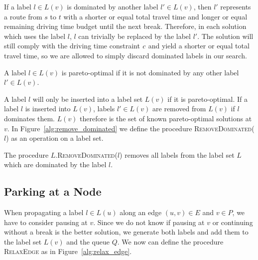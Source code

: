If a label $l \in L(v)$ is dominated by another label $l' \in L(v)$, then $l'$ represents a route from $s$ to $t$ with a shorter or equal total travel time and longer or equal remaining driving time budget until the next break. Therefore, in each solution which uses the label $l$, $l$ can trivially be replaced by the label $l'$. The solution will still comply with the driving time constraint $c$ and yield a shorter or equal total travel time, so we are allowed to simply discard dominated labels in our search.

\begin{definition}
	A label $l \in L(v)$ is pareto-optimal if it is not dominated by any other label $l' \in L(v)$.
\end{definition}

A label $l$ will only be inserted into a label set $L(v)$ if it is pareto-optimal. If a label $l$ is inserted into $L(v)$, labels $l' \in L(v)$ are removed from $L(v)$ if $l$ dominates them. $L(v)$ therefore is the set of known pareto-optimal solutions at $v$. In Figure~\ref{alg:remove_dominated} we define the procedure \textsc{RemoveDominated($l$)} as an operation on a label set.

\begin{algorithm}[hbtp]
	\DontPrintSemicolon


	\caption{\label{alg:remove_dominated}The procedure $L$.\textsc{RemoveDominated}($l$) removes all labels from the label set $L$ which are dominated by the label $l$.}
\end{algorithm}


\subsection{Parking at a Node}
When propagating a label $l \in L(u)$ along an edge $(u,v) \in E$ and $v \in P$, we have to consider pausing at $v$. Since we do not know if pausing at $v$ or continuing without a break is the better solution, we generate both labels and add them to the label set $L(v)$ and the queue $Q$. We now can define the procedure \textsc{RelaxEdge} as in Figure~\ref{alg:relax_edge}.


